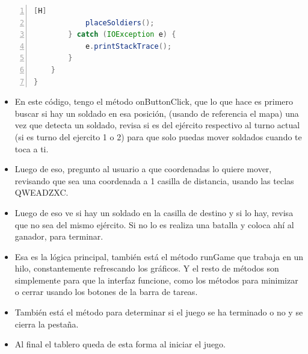 \documentclass{article}
\begin{document}
\begin{lstlisting}[language=java,caption={Clase controladora}, numbers=left][H]
            placeSoldiers();
        } catch (IOException e) {
            e.printStackTrace();
        }
    }
}
	\end{lstlisting}
	
	\begin{itemize}
		\item En este código, tengo el método onButtonClick, que lo que hace es primero buscar si hay un soldado en esa posición, (usando de referencia el mapa) una vez que detecta un soldado, revisa si es del ejército respectivo al turno actual (si es turno del ejercito 1 o 2) para que solo puedas mover soldados cuando te toca a ti.
		\item Luego de eso, pregunto al usuario a que coordenadas lo quiere mover, revisando que sea una coordenada a 1 casilla de distancia, usando las teclas QWEADZXC.
		\item Luego de eso ve si hay un soldado en la casilla de destino y si lo hay, revisa que no sea del mismo ejército. Si no lo es realiza una batalla y coloca ahí al ganador, para terminar.
		 \item Esa es la lógica principal, también está el método runGame que trabaja en un hilo, constantemente refrescando los gráficos. Y el resto de métodos son simplemente para que la interfaz funcione, como los métodos para minimizar o cerrar usando los botones de la barra de tareas. 
		 \item También está el método para determinar si el juego se ha terminado o no y se cierra la pestaña.
		 
		 \item Al final el tablero queda de esta forma al iniciar el juego.
	\end{itemize}
	
\end{document}
